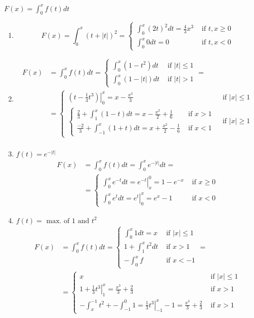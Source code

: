 \documentclass[twoside]{amsart}
\theoremstyle{plain}
\theoremstyle{definition}
\newcommand{\exercisehead}[1]
  {\smallskip
   \noindent{\small\bf Exercise #1.}}
\begin{document}
\exercisehead{16} $F(x) = \int_0^x f(t) dt $
\begin{enumerate}
\item \[
F(x) = \int_0^x (t+|t|)^2 = \begin{cases} \int_0^x (2t)^2 dt = \frac{4}{3} x^3 & \text{ if } t,x \geq 0 \\
  \int_0^x 0 dt = 0 & \text{ if } t,x < 0 \end{cases} 
\]
\item
\[
\begin{aligned}
  F(x) & = \int_0^x f(t) dt = \begin{cases} \int_0^x (1-t^2) dt & \text{ if } |t| \leq 1 \\ \int_0^x (1-|t|) dt & \text{ if } |t| > 1 \end{cases} = \\
  & = \begin{cases} \left. \left( t - \frac{1}{3} t^3 \right) \right|_0^x = x - \frac{x^3}{3} & \text{ if } |x| \leq 1 \\ \begin{cases} \frac{2}{3} + \int_1^x (1-t) dt = x - \frac{x^2}{2} + \frac{1}{6} & \text{ if } x > 1 \\ \frac{-2}{3} + \int_{-1}^x (1+t) dt = x + \frac{x^2}{2} - \frac{1}{6} & \text{ if } x < 1 \end{cases} & \text{ if } |x| \geq 1 \end{cases} \\
\end{aligned}
\]
\item $f(t) = e^{-|t| }$
\[
\begin{aligned}
  F(x) & = \int_0^x f(t) dt = \int_0^x e^{-|t|} dt = \\
  & = \begin{cases} \int_0^x e^{-t} dt = \left. e^{-t} \right|_x^0 = 1 - e^{-x} & \text{ if } x \geq 0 \\
    \int_0^x e^t dt = \left. e^t \right|_0^x = e^x -1 & \text{ if } x < 0 
\end{cases} 
\end{aligned}
\]
\item $f(t) = \text{ max. of $1$ and $t^2$ } $  
\[
\begin{aligned}
F(x) & = \int_0^x f(t) dt = \begin{cases} 
  \int_0^x 1 dt = x & \text{ if } |x| \leq 1 \\
  1 + \int_1^x t^2 dt & \text{ if } x > 1 \\
  -\int_0^x f & \text{ if } x < -1 
\end{cases} = \\
& = \begin{cases} 
x & \text{ if } |x| \leq 1 \\
1 + \left. \frac{1}{3} t^3  \right|_1^x = \frac{x^3}{3} + \frac{2}{3} & \text{ if } x > 1 \\
- \int_x^{-1} t^2 + - \int_{-1}^0 1 = \left. \frac{1}{3} t^3 \right|_{-1}^x -1 = \frac{x^3}{3} + \frac{2}{3} & \text{ if } x > 1 
\end{cases}
\end{aligned}
\]
\end{enumerate}
\end{document}
